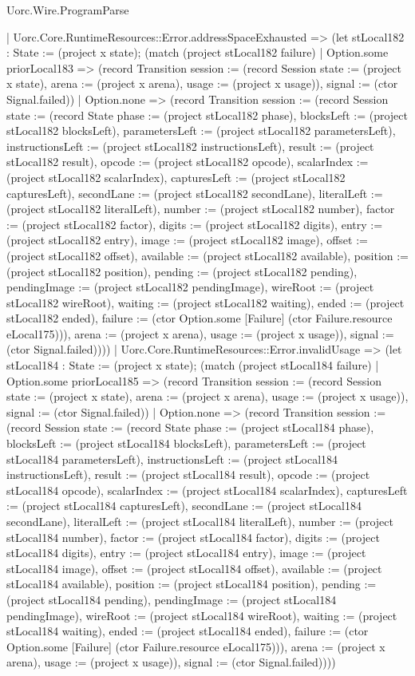 \begin{lexlean}{Uorc.Wire.ProgramParse}
\begin{semanticmodule}
{      | Uorc.Core.RuntimeResources::Error.addressSpaceExhausted => (let stLocal182 : State := (project x state); (match (project stLocal182 failure)
        | Option.some priorLocal183 => (record Transition {session := (record Session {state := (project x state), arena := (project x arena), usage := (project x usage)}), signal := (ctor Signal.failed)})
        | Option.none => (record Transition {session := (record Session {state := (record State {phase := (project stLocal182 phase), blocksLeft := (project stLocal182 blocksLeft), parametersLeft := (project stLocal182 parametersLeft), instructionsLeft := (project stLocal182 instructionsLeft), result := (project stLocal182 result), opcode := (project stLocal182 opcode), scalarIndex := (project stLocal182 scalarIndex), capturesLeft := (project stLocal182 capturesLeft), secondLane := (project stLocal182 secondLane), literalLeft := (project stLocal182 literalLeft), number := (project stLocal182 number), factor := (project stLocal182 factor), digits := (project stLocal182 digits), entry := (project stLocal182 entry), image := (project stLocal182 image), offset := (project stLocal182 offset), available := (project stLocal182 available), position := (project stLocal182 position), pending := (project stLocal182 pending), pendingImage := (project stLocal182 pendingImage), wireRoot := (project stLocal182 wireRoot), waiting := (project stLocal182 waiting), ended := (project stLocal182 ended), failure := (ctor Option.some [Failure] (ctor Failure.resource eLocal175))}), arena := (project x arena), usage := (project x usage)}), signal := (ctor Signal.failed)})))
      | Uorc.Core.RuntimeResources::Error.invalidUsage => (let stLocal184 : State := (project x state); (match (project stLocal184 failure)
        | Option.some priorLocal185 => (record Transition {session := (record Session {state := (project x state), arena := (project x arena), usage := (project x usage)}), signal := (ctor Signal.failed)})
        | Option.none => (record Transition {session := (record Session {state := (record State {phase := (project stLocal184 phase), blocksLeft := (project stLocal184 blocksLeft), parametersLeft := (project stLocal184 parametersLeft), instructionsLeft := (project stLocal184 instructionsLeft), result := (project stLocal184 result), opcode := (project stLocal184 opcode), scalarIndex := (project stLocal184 scalarIndex), capturesLeft := (project stLocal184 capturesLeft), secondLane := (project stLocal184 secondLane), literalLeft := (project stLocal184 literalLeft), number := (project stLocal184 number), factor := (project stLocal184 factor), digits := (project stLocal184 digits), entry := (project stLocal184 entry), image := (project stLocal184 image), offset := (project stLocal184 offset), available := (project stLocal184 available), position := (project stLocal184 position), pending := (project stLocal184 pending), pendingImage := (project stLocal184 pendingImage), wireRoot := (project stLocal184 wireRoot), waiting := (project stLocal184 waiting), ended := (project stLocal184 ended), failure := (ctor Option.some [Failure] (ctor Failure.resource eLocal175))}), arena := (project x arena), usage := (project x usage)}), signal := (ctor Signal.failed)})))
}
\end{semanticmodule}
\end{lexlean}
